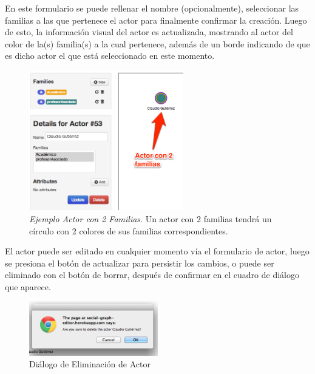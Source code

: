 En este formulario se puede rellenar el nombre (opcionalmente), seleccionar las familias a las que pertenece el actor para finalmente confirmar la creación. Luego de esto, la información visual del actor es actualizada, mostrando al actor del color de la(s) familia(s) a la cual pertenece, además de un borde indicando de que es dicho actor el que está seleccionado en este momento.\\

\begin{figure}[H]
  \centering
  \includegraphics[width=0.6\textwidth]{images/ejemplo_actor_2_familias.png}
  \caption[Ejemplo Actor con 2 Familias]{\emph{Ejemplo Actor con 2 Familias}. Un actor con 2 familias tendrá un círculo con 2 colores de sus familias correspondientes.}
  \label{ejemplo_actor_2_familias}
\end{figure}

El actor puede ser editado en cualquier momento vía el formulario de actor, luego se presiona el botón de actualizar para persistir los cambios, o puede ser eliminado con el botón de borrar, después de confirmar en el cuadro de diálogo 
que aparece.

\begin{figure}[H]
  \centering
  \includegraphics[width=0.5\textwidth]{images/dialogo_eliminacion_actor.png}
  \caption{Diálogo de Eliminación de Actor}
  \label{dialogo_eliminacion_actor}
\end{figure}


